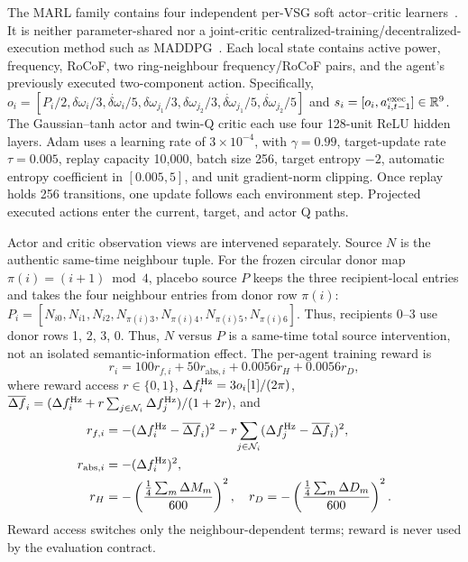 \documentclass[conference,a4paper]{IEEEtran}
\begin{document}
The MARL family contains four independent per-VSG soft actor--critic
learners~\cite{haarnoja2018sac}. It is neither parameter-shared nor a
joint-critic centralized-training/decentralized-execution method such as
MADDPG~\cite{lowe2017maddpg}. Each local state contains active power,
frequency, RoCoF, two ring-neighbour frequency/RoCoF pairs, and the agent's
previously executed two-component action. Specifically,
$o_i=[P_i/2,\delta\omega_i/3,\dot{\delta\omega}_i/5,
\delta\omega_{j_1}/3,\delta\omega_{j_2}/3,
\dot{\delta\omega}_{j_1}/5,\dot{\delta\omega}_{j_2}/5]$ and
$s_i=[o_i,a^{\rm exec}_{i,t-1}]\in\mathbb R^9$. The Gaussian--tanh actor and
twin-Q critic each use four 128-unit ReLU hidden layers. Adam uses a learning rate of
$3\times10^{-4}$, with $\gamma=0.99$, target-update rate $\tau=0.005$, replay
capacity 10,000, batch size 256, target entropy $-2$, automatic entropy
coefficient in $[0.005,5]$, and unit gradient-norm clipping. Once replay holds
256 transitions, one update follows each environment step. Projected executed
actions enter the current, target, and actor Q paths.

Actor and critic observation views are intervened separately. Source $N$ is
the authentic same-time neighbour tuple. For the frozen circular donor map
$\pi(i)=(i+1)\bmod4$, placebo source $P$ keeps the three recipient-local
entries and takes the four neighbour entries from donor row $\pi(i)$:
$P_i=[N_{i0},N_{i1},N_{i2},N_{\pi(i)3},N_{\pi(i)4},N_{\pi(i)5},N_{\pi(i)6}]$.
Thus, recipients 0--3 use donor rows 1, 2, 3, 0.
Thus, $N$ versus $P$ is a same-time total source intervention, not an isolated
semantic-information effect. The per-agent training reward is
\begin{equation}
r_i=100r_{f,i}+50r_{\mathrm{abs},i}+0.0056r_H+0.0056r_D,
\label{eq:reward}
\end{equation}
where reward access $r\in\{0,1\}$,
$\Delta f_i^{\rm Hz}=3o_i[1]/(2\pi)$,
$\overline{\Delta f}_i=(\Delta f_i^{\rm Hz}
+r\sum_{j\in\mathcal N_i}\Delta f_j^{\rm Hz})/(1+2r)$, and
\begin{align}
r_{f,i}&=-(\Delta f_i^{\rm Hz}-\overline{\Delta f}_i)^2
-r\!\sum_{j\in\mathcal N_i}(\Delta f_j^{\rm Hz}-\overline{\Delta f}_i)^2,
\nonumber\\
r_{{\rm abs},i}&=-(\Delta f_i^{\rm Hz})^2,\nonumber\\
r_H&=-\left(\frac{\frac14\sum_m\Delta M_m}{600}\right)^2,
\quad r_D=-\left(\frac{\frac14\sum_m\Delta D_m}{600}\right)^2.
\label{eq:reward_terms}
\end{align}
Reward access switches only the neighbour-dependent terms; reward is never used
by the evaluation contract.
\end{document}
